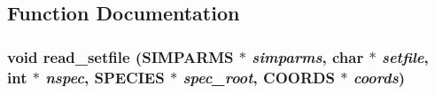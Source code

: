 \subsection{Function Documentation}
\subsubsection{\setlength{\rightskip}{0pt plus 5cm}void read\_\-setfile ({\bf SIMPARMS} $\ast$ {\em simparms}, char $\ast$ {\em setfile}, int $\ast$ {\em nspec}, {\bf SPECIES} $\ast$ {\em spec\_\-root}, {\bf COORDS} $\ast$ {\em coords})}\label{md__readset_8c_6788ee2fb8888623875bcaba953f38a1}


